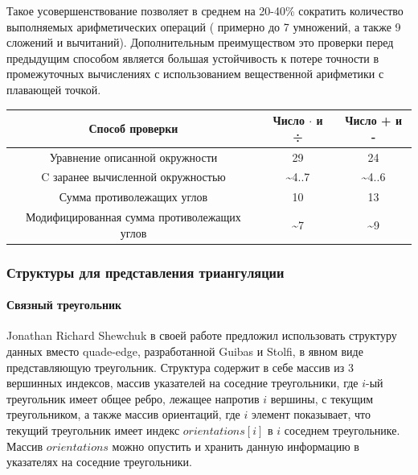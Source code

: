 \documentclass{fefu}
\begin{document}
Такое усовершенствование позволяет в среднем на 20-40\% сократить количество выполняемых арифметических операций (
примерно до 7 умножений, а также 9 сложений и вычитаний). Дополнительным преимуществом это проверки перед предыдущим
способом является большая устойчивость к потере точности в промежуточных вычислениях с использованием вещественной
арифметики с плавающей точкой.
\begin{center}
    \begin{tabular} { |c|c|c| }
        \hline
        Способ проверки & Число $\cdot$ и ÷ & Число + и -\\ [0.5ex]
        \hline
        Уравнение описанной окружности & 29 & 24\\
        C заранее вычисленной окружностью & \textasciitilde 4..7 & \textasciitilde 4..6\\
        Сумма противолежащих углов & 10 & 13\\
        Модифицированная сумма противолежащих углов & \textasciitilde 7 & \textasciitilde 9\\
        \hline
    \end{tabular}
\end{center}
\subsubsection{Структуры для представления триангуляции}
\paragraph{Связный треугольник}
Jonathan Richard Shewchuk в своей работе \cite{MeshGeneration} предложил использовать структуру данных вместо  
quade-edge, разработанной Guibas и Stolfi\cite{QuadEdge}, в явном виде 
представляющую треугольник. Структура содержит в себе массив из 3 вершинных индексов, массив указателей на соседние 
треугольники, где $i$-ый треугольник имеет общее ребро, лежащее напротив $i$ вершины, с текущим треугольником, а также 
массив ориентаций, где $i$ элемент показывает, что текущий треугольник имеет индекс $orientations[i]$ в $i$ соседнем 
треугольнике. Массив $orientations$ можно опустить и хранить данную информацию в указателях на соседние треугольники. 
\end{document}
